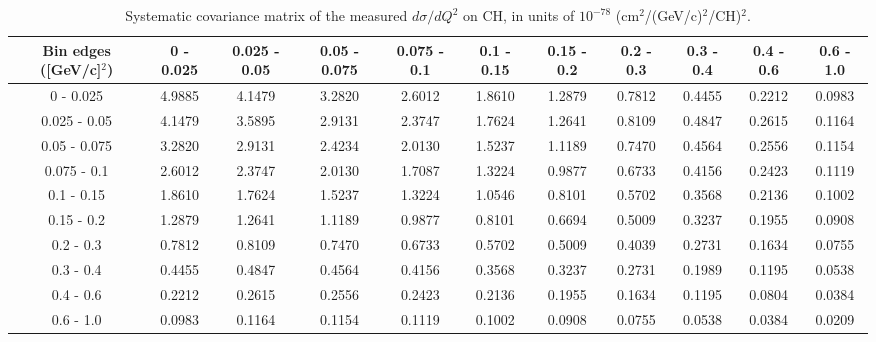 \documentclass[aps,prl,twocolumn,superscriptaddress,nofootinbib]{revtex4-1}
\begin{document}
\begin{table}[h!]
  \centering
  \caption{Systematic covariance matrix of the measured $d\sigma/dQ^{2}$ on CH, in units of $10^{-78}$ (cm$^{2}$/(GeV/c)$^{2}$/CH)$^{2}$.}
    \begin{tabular}{c||cccccccccc}
      Bin edges ([GeV/c]$^{2}$) & 0 - 0.025 & 0.025 - 0.05 & 0.05 - 0.075 & 0.075 - 0.1 & 0.1 - 0.15 & 0.15 - 0.2 & 0.2 - 0.3 & 0.3 - 0.4 & 0.4 - 0.6 & 0.6 - 1.0 \\
\hline \hline
         0 - 0.025 &  4.9885 &  4.1479 &  3.2820 &  2.6012 &  1.8610 &  1.2879 &  0.7812 &  0.4455 &  0.2212 &  0.0983 \\
      0.025 - 0.05 &  4.1479 &  3.5895 &  2.9131 &  2.3747 &  1.7624 &  1.2641 &  0.8109 &  0.4847 &  0.2615 &  0.1164 \\
      0.05 - 0.075 &  3.2820 &  2.9131 &  2.4234 &  2.0130 &  1.5237 &  1.1189 &  0.7470 &  0.4564 &  0.2556 &  0.1154 \\
       0.075 - 0.1 &  2.6012 &  2.3747 &  2.0130 &  1.7087 &  1.3224 &  0.9877 &  0.6733 &  0.4156 &  0.2423 &  0.1119 \\
        0.1 - 0.15 &  1.8610 &  1.7624 &  1.5237 &  1.3224 &  1.0546 &  0.8101 &  0.5702 &  0.3568 &  0.2136 &  0.1002 \\
        0.15 - 0.2 &  1.2879 &  1.2641 &  1.1189 &  0.9877 &  0.8101 &  0.6694 &  0.5009 &  0.3237 &  0.1955 &  0.0908 \\
         0.2 - 0.3 &  0.7812 &  0.8109 &  0.7470 &  0.6733 &  0.5702 &  0.5009 &  0.4039 &  0.2731 &  0.1634 &  0.0755 \\
         0.3 - 0.4 &  0.4455 &  0.4847 &  0.4564 &  0.4156 &  0.3568 &  0.3237 &  0.2731 &  0.1989 &  0.1195 &  0.0538 \\
         0.4 - 0.6 &  0.2212 &  0.2615 &  0.2556 &  0.2423 &  0.2136 &  0.1955 &  0.1634 &  0.1195 &  0.0804 &  0.0384 \\
         0.6 - 1.0 &  0.0983 &  0.1164 &  0.1154 &  0.1119 &  0.1002 &  0.0908 &  0.0755 &  0.0538 &  0.0384 &  0.0209 \\
    \end{tabular}
  \label{tablecov:CH_Systematic_Q2}
\end{table}
\end{document}
